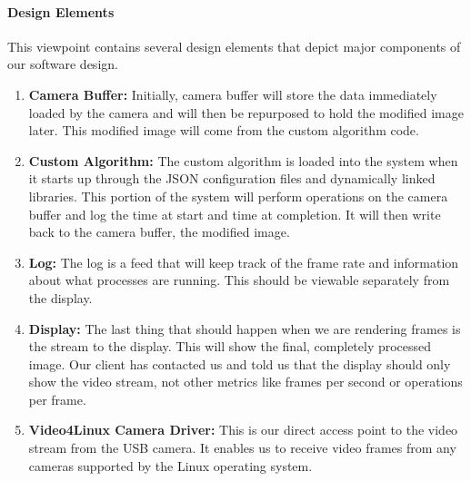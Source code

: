 	\paragraph{Design Elements}
	This viewpoint contains several design elements that depict major components of our software design.\\
	
	\begin{enumerate}[leftmargin=2cm,labelindent=2cm]
	\item \textbf{Camera Buffer:}
	Initially, camera buffer will store the data immediately loaded by the camera and will then be repurposed to hold the modified image later. This 		modified image will come from the custom algorithm code.

	\item \textbf{Custom Algorithm:}
	The custom algorithm is loaded into the system when it starts up through the JSON configuration files and dynamically linked libraries. This 		portion of the system will perform operations on the camera buffer and log the time at start and time at completion. It will then write back to the 		camera buffer, the modified image.

	\item \textbf{Log:}
	The log is a feed that will keep track of the frame rate and information about what processes are running. This should be viewable separately from 	the display.

	\item \textbf{Display:}
	The last thing that should happen when we are rendering frames is the stream to the display. This will show the final, completely processed 		image. Our client has contacted us and told us that the display should only show the video stream, not other metrics like frames per second or 		operations per frame.

	\item \textbf{Video4Linux Camera Driver:}
	This is our direct access point to the video stream from the USB camera. It enables us to receive video frames from any cameras supported by 	the Linux operating system.\\
	\end{enumerate}
	

